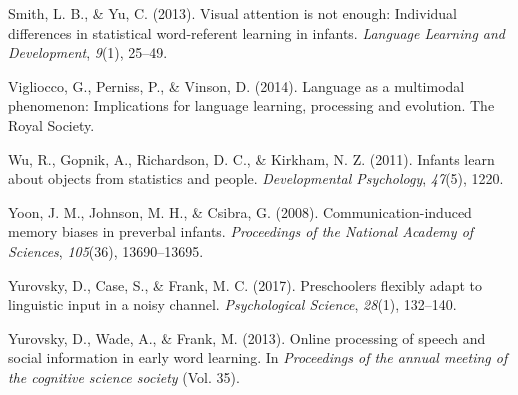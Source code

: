 \documentclass[10pt, letterpaper]{article}
\begin{document}
\leavevmode\hypertarget{ref-smith2013visual}{}%
Smith, L. B., \& Yu, C. (2013). Visual attention is not enough:
Individual differences in statistical word-referent learning in infants.
\emph{Language Learning and Development}, \emph{9}(1), 25--49.

\leavevmode\hypertarget{ref-vigliocco2014language}{}%
Vigliocco, G., Perniss, P., \& Vinson, D. (2014). Language as a
multimodal phenomenon: Implications for language learning, processing
and evolution. The Royal Society.

\leavevmode\hypertarget{ref-wu2011infants}{}%
Wu, R., Gopnik, A., Richardson, D. C., \& Kirkham, N. Z. (2011). Infants
learn about objects from statistics and people. \emph{Developmental
Psychology}, \emph{47}(5), 1220.

\leavevmode\hypertarget{ref-yoon2008communication}{}%
Yoon, J. M., Johnson, M. H., \& Csibra, G. (2008). Communication-induced
memory biases in preverbal infants. \emph{Proceedings of the National
Academy of Sciences}, \emph{105}(36), 13690--13695.

\leavevmode\hypertarget{ref-yurovsky2017preschoolers}{}%
Yurovsky, D., Case, S., \& Frank, M. C. (2017). Preschoolers flexibly
adapt to linguistic input in a noisy channel. \emph{Psychological
Science}, \emph{28}(1), 132--140.

\leavevmode\hypertarget{ref-yurovsky2013online}{}%
Yurovsky, D., Wade, A., \& Frank, M. (2013). Online processing of speech
and social information in early word learning. In \emph{Proceedings of
the annual meeting of the cognitive science society} (Vol. 35).


\end{document}
